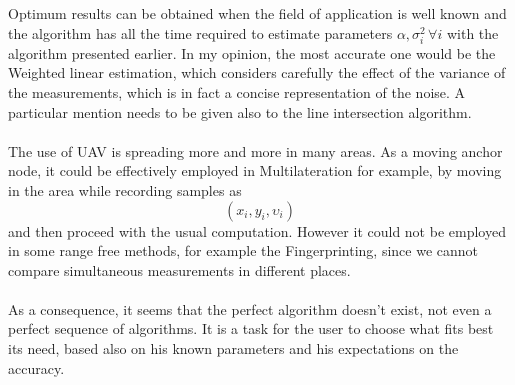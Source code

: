 \documentclass[12pt]{report}
\begin{document}
Optimum results can be obtained when the field of application is well known and the algorithm has all the time required to estimate parameters $\alpha,\sigma_i^2\,\forall i$ with the algorithm presented earlier. In my opinion, the most accurate one would be the Weighted linear estimation, which considers carefully the effect of the variance of the measurements, which is in fact a concise representation of the noise. A particular mention needs to be given also to the line intersection algorithm.\\\\
The use of UAV is spreading more and more in many areas. As a moving anchor node, it could be effectively employed in Multilateration for example, by moving in the area while recording samples as $$(x_i,y_i,\upsilon_i)$$ and then proceed with the usual computation. However it could not be employed in some range free methods, for example the Fingerprinting, since we cannot compare simultaneous measurements in different places.\\\\
As a consequence, it seems that the perfect algorithm doesn't exist, not even a perfect sequence of algorithms. It is a task for the user to choose what fits best its need, based also on his known parameters and his expectations on the accuracy.\\\\











\clearpage
\printbibliography[
heading=bibintoc,
title={Bibliography}
]


\end{document}
